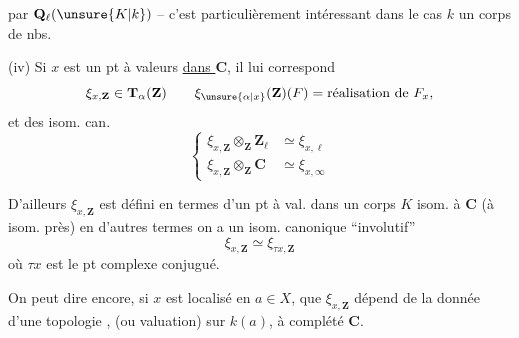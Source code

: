 par $\mathbf Q_\ell(\unsure{K|k})$ -- c'est particulièrement intéressant dans le cas $k$ un corps de nbs.

(iv) Si $x$ est un pt à valeurs \uline{dans $\mathbf C$}, il lui correspond
\[
\xi_{x,\mathbf Z}\in\mathbf T_\alpha(\mathbf Z)
\qquad \xi_{\unsure{\alpha|x}}(\mathbf Z)(F)=\text{réalisation de }F_x,
\]
et des isom. can.
\[
\left\{\begin{aligned}
\xi_{x,\mathbf Z}\otimes_{\mathbf Z}\mathbf Z_\ell&\simeq\xi_{x,\ell}\\
\xi_{x,\mathbf Z}\otimes_{\mathbf Z}\mathbf C&\simeq\xi_{x,\infty}
\end{aligned}\right.
\]

D'ailleurs $\xi_{x,\mathbf Z}$ est défini en termes d'un pt à val. dans un corps  $K$ isom. à $\mathbf C$ (à isom.  près) en d'autres termes on a un isom. canonique ``involutif''
\[
\xi_{x,\mathbf Z}\simeq\xi_{\tau x,\mathbf Z}
\]
où $\tau x$ est le pt complexe conjugué.

 On peut dire encore, si $x$ est localisé en $a\in X$, que  $\xi_{x,\mathbf Z}$ dépend de la donnée d'une topologie , (ou valuation) sur $k(a)$, à complété $\mathbf C$.
